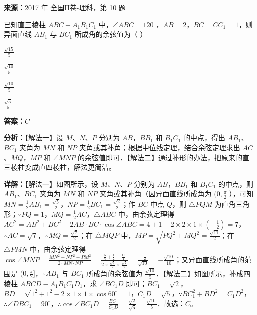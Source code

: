 \begin{question}[points=5]
\textbf{来源：}2017 年 全国II卷-理科，第 10 题\par
已知直三棱柱 $ABC-A_1B_1C_1$ 中，$\angle ABC=120^\circ$，$AB=2$，$BC=CC_1=1$，则异面直线 $AB_1$ 与 $BC_1$ 所成角的余弦值为（   ）
\begin{choices}
  \item $\frac{\sqrt{15}}{5}$
  \item $\frac{\sqrt{10}}{5}$
  \item $\frac{\sqrt{10}}{5}$
  \item $\frac{\sqrt{5}}{5}$
\end{choices}
\begin{solution}
\textbf{答案：}$C$

\textbf{分析：}【解法一】设 $M$、$N$、$P$ 分别为 $AB$，$BB_1$ 和 $B_1C_1$ 的中点，得出 $AB_1$、$BC_1$ 夹角为 $MN$ 和 $NP$ 夹角或其补角；根据中位线定理，结合余弦定理求出 $AC$、$MQ$，$MP$ 和 $\angle MNP$ 的余弦值即可．【解法二】通过补形的办法，把原来的直三棱柱变成直四棱柱，解法更简洁。

\textbf{详解：}【解法一】如图所示，设 $M$、$N$、$P$ 分别为 $AB$，$BB_1$ 和 $B_1C_1$ 的中点，则 $AB_1$、$BC_1$ 夹角为 $MN$ 和 $NP$ 夹角或其补角（因异面直线所成角为 $(0,\frac{\pi}{2}]$），可知 $MN=\frac{1}{2}AB_1=\frac{\sqrt{5}}{2}$，$NP=\frac{1}{2}BC_1=\frac{\sqrt{2}}{2}$；作 $BC$ 中点 $Q$，则 $\triangle PQM$ 为直角三角形；$\because PQ=1$，$MQ=\frac{1}{2}AC$，$\triangle ABC$ 中，由余弦定理得 $AC^2=AB^2+BC^2-2AB\cdot BC\cdot\cos\angle ABC=4+1-2\times2\times1\times(-\frac{1}{2})=7$，$\therefore AC=\sqrt{7}$，$\therefore MQ=\frac{\sqrt{7}}{2}$；在 $\triangle MQP$ 中，$MP=\sqrt{PQ^2+MQ^2}=\frac{\sqrt{11}}{2}$；在 $\triangle PMN$ 中，由余弦定理得 $\cos\angle MNP=\frac{MN^2+NP^2-PM^2}{2\cdot MN\cdot NP}=\frac{\frac{5}{4}+\frac{1}{2}-\frac{11}{4}}{2\times\frac{\sqrt{5}}{2}\times\frac{\sqrt{2}}{2}}=\frac{-\frac{1}{2}}{\sqrt{10}}=-\frac{\sqrt{10}}{10}$；又异面直线所成角的范围是 $(0,\frac{\pi}{2}]$，$\therefore AB_1$ 与 $BC_1$ 所成角的余弦值为 $\frac{\sqrt{10}}{5}$．【解法二】如图所示，补成四棱柱 $ABCD-A_1B_1C_1D_1$，求 $\angle BC_1D$ 即可；$BC_1=\sqrt{2}$，$BD=\sqrt{1^2+1^2-2\times1\times1\times\cos60^\circ}=1$，$C_1D=\sqrt{5}$，$\because BC_1^2+BD^2=C_1D^2$，$\therefore\angle DBC_1=90^\circ$，$\therefore\cos\angle BC_1D=\frac{BC_1}{C_1D}=\frac{\sqrt{2}}{\sqrt{5}}=\frac{\sqrt{10}}{5}$．故选：$C$。
\end{solution}
\end{question}


